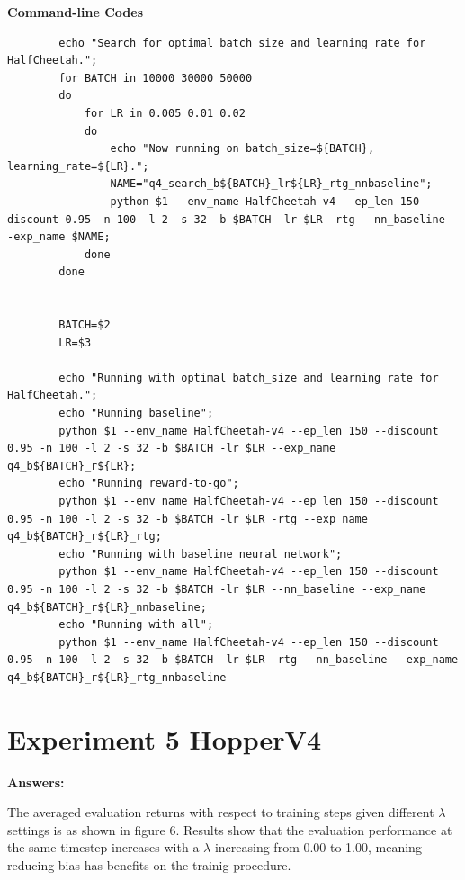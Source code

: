 \documentclass[10pt, letterpaper]{article}
\begin{document}
    \textbf{Command-line Codes}
    \begin{lstlisting}
        echo "Search for optimal batch_size and learning rate for HalfCheetah.";
        for BATCH in 10000 30000 50000
        do
            for LR in 0.005 0.01 0.02
            do
                echo "Now running on batch_size=${BATCH}, learning_rate=${LR}.";
                NAME="q4_search_b${BATCH}_lr${LR}_rtg_nnbaseline";
                python $1 --env_name HalfCheetah-v4 --ep_len 150 --discount 0.95 -n 100 -l 2 -s 32 -b $BATCH -lr $LR -rtg --nn_baseline --exp_name $NAME;
            done
        done


        BATCH=$2
        LR=$3

        echo "Running with optimal batch_size and learning rate for HalfCheetah.";
        echo "Running baseline";
        python $1 --env_name HalfCheetah-v4 --ep_len 150 --discount 0.95 -n 100 -l 2 -s 32 -b $BATCH -lr $LR --exp_name q4_b${BATCH}_r${LR};
        echo "Running reward-to-go";
        python $1 --env_name HalfCheetah-v4 --ep_len 150 --discount 0.95 -n 100 -l 2 -s 32 -b $BATCH -lr $LR -rtg --exp_name q4_b${BATCH}_r${LR}_rtg;
        echo "Running with baseline neural network";
        python $1 --env_name HalfCheetah-v4 --ep_len 150 --discount 0.95 -n 100 -l 2 -s 32 -b $BATCH -lr $LR --nn_baseline --exp_name q4_b${BATCH}_r${LR}_nnbaseline;
        echo "Running with all";
        python $1 --env_name HalfCheetah-v4 --ep_len 150 --discount 0.95 -n 100 -l 2 -s 32 -b $BATCH -lr $LR -rtg --nn_baseline --exp_name q4_b${BATCH}_r${LR}_rtg_nnbaseline
    \end{lstlisting}

    \newpage
    \section*{Experiment 5 HopperV4}

    \textbf{Answers:}

    The averaged evaluation returns with respect to training steps given different $\lambda$ settings is as shown in figure 6. Results show that the evaluation performance at the same timestep increases with a $\lambda$ increasing from 0.00 to 1.00, meaning reducing bias has benefits on the trainig procedure.
\end{document}
